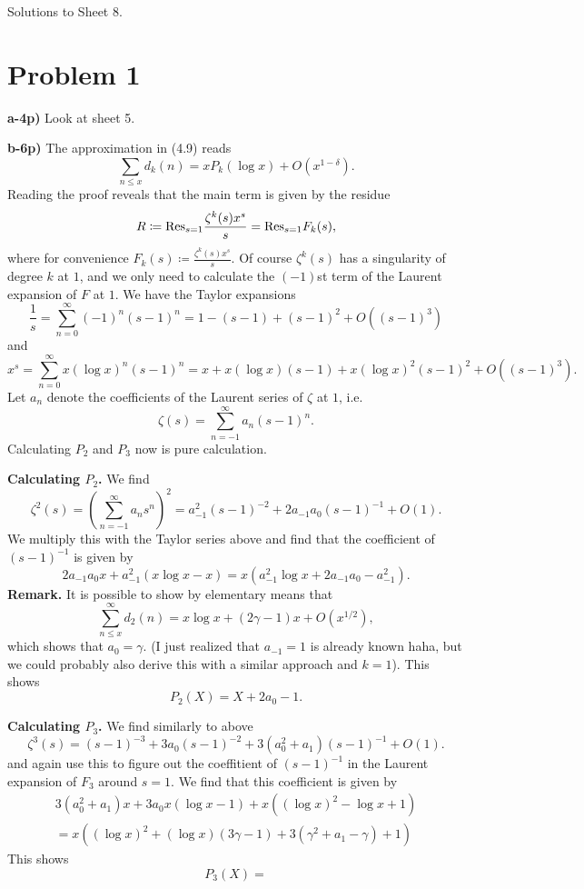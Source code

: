 \documentclass[a4paper,11pt]{article}
\author{Max von Consbruch}
\begin{document}
\begin{center}
    \huge{Solutions to Sheet 8.}
\end{center}

\section*{Problem 1}
\textbf{a-4p)} Look at sheet 5.

\textbf{b-6p)} The approximation in (4.9) reads 
\[
    \sum_{n \leq x} d_k(n) = x P_k(\log x) + O(x^{1-\delta}).
\]
Reading the proof reveals that the main term is given by the residue
\[
    R \coloneqq \mathrm{Res}_{s=1} \frac{\zeta^k(s) x^s}s = \mathrm{Res}_{s=1} F_k(s),
\]
where for convenience $F_k(s) \coloneqq \frac{\zeta^k(s) x^s}s.$
Of course $\zeta^k(s)$ has a singularity of degree $k$ at $1$, and we only need 
to calculate the $(-1)$st term of the Laurent expansion of $F$ at $1$. 
We have the Taylor expansions
\[
    \frac 1{s} =  \sum_{n=0}^\infty (-1)^n (s-1)^n = 1 - (s-1) + (s-1)^2 + O((s-1)^3)
\]
and
\[
    x^s = \sum_{n=0}^\infty x(\log x)^n (s-1)^n = x + x(\log x)(s-1) + x(\log x)^2(s-1)^2 + O((s-1)^3). 
\]
Let $a_n$ denote the coefficients of the Laurent series of $\zeta$ at $1$, i.e.
\[
    \zeta(s) = \sum_{n = -1}^\infty a_n (s-1)^n.
\]
Calculating $P_2$ and $P_3$ now is pure calculation. 

\textbf{Calculating $P_2$.} We find
\[
    \zeta^2(s) = \left( \sum_{n=-1}^\infty a_n s^n \right)^2
    = a_{-1}^2 (s-1)^{-2} + 2a_{-1}a_0 (s-1)^{-1} + O(1).
\]
We multiply this with the Taylor series above and find that the coefficient of 
$(s-1)^{-1}$ is given by 
\[
    2a_{-1}a_0 x + a_{-1}^2 (x \log x - x) = x ( a_{-1}^2 \log x + 2a_{-1}a_0-a_{-1}^2).
\]
\textbf{Remark.} It is possible to show by elementary means that 
\[
    \sum_{n\leq x}^\infty d_2(n) = x \log x + (2\gamma-1)x + O(x^{1/2}),
\]
which shows that $a_0 = \gamma$. (I just realized that $a_{-1} = 1$ is already
known haha, but we could probably also derive this with a similar approach and
$k=1$). This shows 
\[
    P_2(X) = X + 2a_0 - 1.
\]

\textbf{Calculating $P_3$.} We find similarly to above
\[
    \zeta^3(s) = (s-1)^{-3} + 3a_0 (s-1)^{-2} + 3(a_0^2 + a_1)(s-1)^{-1} + O(1).
\]
and again use this to figure out the coeffitient of $(s-1)^{-1}$ in the 
Laurent expansion of $F_3$ around $s=1$. We find that this coefficient is given by
\begin{multline*}
    3(a_0^2 + a_1)x + 3a_0x ( \log x - 1) + x ((\log x)^2 - \log x + 1) \\
    = x ( (\log x)^2 + (\log x)(3 \gamma - 1) + 3 (\gamma^2 + a_1 - \gamma) + 1)
\end{multline*}
This shows 
\[
    P_3(X) = 
\]
\end{document}
